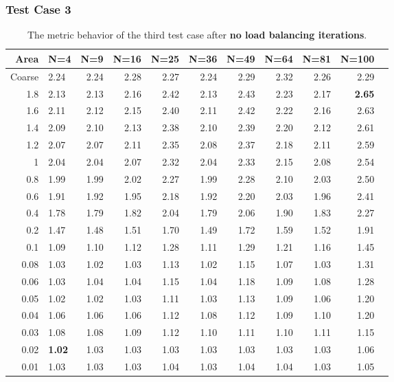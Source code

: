 \documentclass[compress]{beamer}
\begin{document}
\begin{frame}[t]\frametitle{Test Case 3}
\begin{table}[H]
\tiny
\centering
\caption{The metric behavior of the third test case after\textbf{ no load balancing iterations}.} 
\begin{tabular}{rlrrrrrrrrr}
  \hline
 Area & N=4 & N=9 & N=16 & N=25 & N=36 & N=49 & N=64 & N=81 & N=100 \\ 
  \hline
 Coarse & 2.24 & 2.24 & 2.28 & 2.27 & 2.24 & 2.29 & 2.32 & 2.26 & 2.29 \\ 
 1.8 & 2.13 & 2.13 & 2.16 & 2.42 & 2.13 & 2.43 & 2.23 & 2.17 & \textbf{\cellcolor{blue!25}2.65} \\ 
   1.6 & 2.11 & 2.12 & 2.15 & 2.40 & 2.11 & 2.42 & 2.22 & 2.16 & 2.63 \\ 
   1.4 & 2.09 & 2.10 & 2.13 & 2.38 & 2.10 & 2.39 & 2.20 & 2.12 & 2.61 \\ 
 1.2 & 2.07 & 2.07 & 2.11 & 2.35 & 2.08 & 2.37 & 2.18 & 2.11 & 2.59 \\ 
 1 & 2.04 & 2.04 & 2.07 & 2.32 & 2.04 & 2.33 & 2.15 & 2.08 & 2.54 \\ 
 0.8 & 1.99 & 1.99 & 2.02 & 2.27 & 1.99 & 2.28 & 2.10 & 2.03 & 2.50 \\ 
0.6 & 1.91 & 1.92 & 1.95 & 2.18 & 1.92 & 2.20 & 2.03 & 1.96 & 2.41 \\ 
 0.4 & 1.78 & 1.79 & 1.82 & 2.04 & 1.79 & 2.06 & 1.90 & 1.83 & 2.27 \\ 
 0.2 & 1.47 & 1.48 & 1.51 & 1.70 & 1.49 & 1.72 & 1.59 & 1.52 & 1.91 \\ 
   0.1 & 1.09 & 1.10 & 1.12 & 1.28 & 1.11 & 1.29 & 1.21 & 1.16 & 1.45 \\ 
 0.08 & 1.03 & 1.02 & 1.03 & 1.13 & 1.02 & 1.15 & 1.07 & 1.03 & 1.31 \\ 
 0.06 & 1.03 & 1.04 & 1.04 & 1.15 & 1.04 & 1.18 & 1.09 & 1.08 & 1.28 \\ 
0.05 & 1.02 & 1.02 & 1.03 & 1.11 & 1.03 & 1.13 & 1.09 & 1.06 & 1.20 \\ 
 0.04 & 1.06 & 1.06 & 1.06 & 1.12 & 1.08 & 1.12 & 1.09 & 1.10 & 1.20 \\ 
  0.03 & 1.08 & 1.08 & 1.09 & 1.12 & 1.10 & 1.11 & 1.10 & 1.11 & 1.15 \\ 
  0.02 & \textbf{\cellcolor{blue!25}1.02} & 1.03 & 1.03 & 1.03 & 1.03 & 1.03 & 1.03 & 1.03 & 1.06 \\ 
 0.01 & 1.03 & 1.03 & 1.03 & 1.04 & 1.03 & 1.04 & 1.04 & 1.03 & 1.05 \\ 
   \hline
\end{tabular}
\end{table}
\end{frame}
\end{document}
